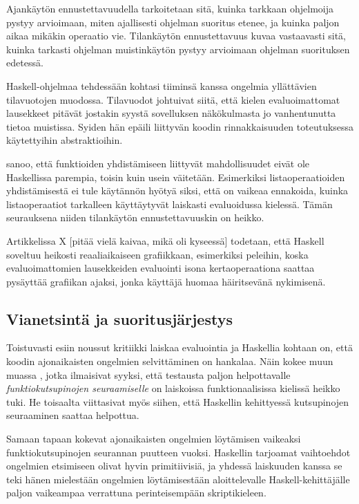 Ajankäytön ennustettavuudella tarkoitetaan sitä, kuinka tarkkaan ohjelmoija pystyy arvioimaan, miten ajallisesti ohjelman suoritus etenee, ja kuinka paljon aikaa mikäkin operaatio vie. Tilankäytön ennustettavuus kuvaa vastaavasti sitä, kuinka tarkasti ohjelman muistinkäytön pystyy arvioimaan ohjelman suorituksen edetessä.

Haskell-ohjelmaa tehdessään \citet{sampson2009experience} kohtasi tiiminsä kanssa ongelmia yllättävien tilavuotojen muodossa. Tilavuodot johtuivat siitä, että kielen evaluoimattomat lausekkeet pitävät jostakin syystä sovelluksen näkökulmasta jo vanhentunutta tietoa muistissa. Syiden hän epäili liittyvän koodin rinnakkaisuuden toteutuksessa käytettyihin abstraktioihin.

\citet{vesakarvonen} sanoo, että funktioiden yhdistämiseen liittyvät mahdollisuudet eivät ole Haskellissa parempia, toisin kuin usein väitetään. Esimerkiksi listaoperaatioiden yhdistämisestä ei tule käytännön hyötyä siksi, että on vaikeaa ennakoida, kuinka listaoperaatiot tarkalleen käyttäytyvät laiskasti evaluoidussa kielessä. Tämän seurauksena niiden tilankäytön ennustettavuuskin on heikko.

Artikkelissa X [pitää vielä kaivaa, mikä oli kyseessä] todetaan, että Haskell soveltuu heikosti reaaliaikaiseen grafiikkaan, esimerkiksi peleihin, koska evaluoimattomien lausekkeiden evaluointi isona kertaoperaationa saattaa pysäyttää grafiikan ajaksi, jonka käyttäjä huomaa häiritsevänä nykimisenä.

\subsection{Vianetsintä ja suoritusjärjestys}

Toistuvasti esiin noussut kritiikki laiskaa evaluointia ja Haskellia kohtaan on, että koodin ajonaikaisten ongelmien selvittäminen on hankalaa. Näin kokee muun muassa \citet{daniels2012experience}, jotka ilmaisivat syyksi, että testausta paljon helpottavalle \textit{funktiokutsupinojen seuraamiselle} on laiskoissa funktionaalisissa kielissä heikko tuki. He toisaalta viittasivat myös siihen, että Haskellin kehittyessä kutsupinojen seuraaminen saattaa helpottua.

Samaan tapaan \citet{pop2010experience} kokevat ajonaikaisten ongelmien löytämisen vaikeaksi funktiokutsupinojen seurannan puutteen vuoksi. Haskellin tarjoamat vaihtoehdot ongelmien etsimiseen olivat hyvin primitiivisiä, ja yhdessä laiskuuden kanssa se teki hänen mielestään ongelmien löytämisestään aloittelevalle Haskell-kehittäjälle paljon vaikeampaa verrattuna perinteisempään skriptikieleen.

